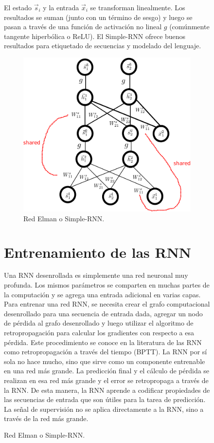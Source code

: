 \documentclass{book}
\begin{document}
\begin{figure}[h]
{El estado $\vec{s}_i$ y la entrada $\vec{x}_i$ se transforman linealmente. Los resultados se suman (junto con un término de sesgo) y luego se pasan a través de una función de activación no lineal $g$ (comúnmente tangente hiperbólica o ReLU). El Simple-RNN ofrece buenos resultados para etiquetado de secuencias y modelado del lenguaje.

\begin{figure}[h]
  \centering
  \includegraphics[scale=0.55]{pics/elman.pdf}
  \caption{Red Elman o Simple-RNN.}
\end{figure}

\section{Entrenamiento de las RNN}

Una RNN desenrollada es simplemente una red neuronal muy profunda. Los mismos parámetros se comparten en muchas partes de la computación y se agrega una entrada adicional en varias capas. Para entrenar una red RNN, se necesita crear el grafo computacional desenrollado para una secuencia de entrada dada, agregar un nodo de pérdida al grafo desenrollado y luego utilizar el algoritmo de retropropagación para calcular los gradientes con respecto a esa pérdida. Este procedimiento se conoce en la literatura de las RNN como retropropagación a través del tiempo (BPTT). La RNN por sí sola no hace mucho, sino que sirve como un componente entrenable en una red más grande. La predicción final y el cálculo de pérdida se realizan en esa red más grande y el error se retropropaga a través de la RNN. De esta manera, la RNN aprende a codificar propiedades de las secuencias de entrada que son útiles para la tarea de predicción. La señal de supervisión no se aplica directamente a la RNN, sino a través de la red más grande.

}
\end{figure}
\end{document}
